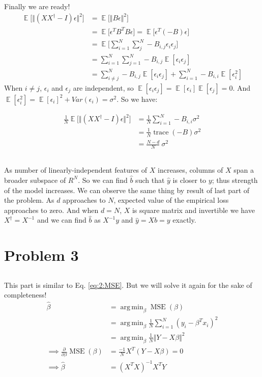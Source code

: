 \documentclass[]{article}
\numberwithin{equation}{section}
\DeclareMathOperator*{\trace}{trace}
\newcommand{\norm}[2][]{\Vert #2\Vert_{#1}}
\newcommand{\transpose}{^T}
\DeclareMathOperator{\EX}{\mathbb{E}}%
\DeclareMathOperator*{\argmin}{arg\,min}
\DeclareMathOperator*{\MSE}{MSE}
\begin{document}
Finally we are ready!
\begin{align}
\EX\biggl[\norm{(XX^{\dagger} -I)\epsilon}^2\biggr] &= \EX\biggl[\norm{B\epsilon}^2\biggr]\\
 &= \EX\biggl[\epsilon\transpose B\transpose B \epsilon \biggr] = \EX\biggl[\epsilon\transpose (-B) \epsilon \biggr]\\
& = \EX\biggl[\sum_{i=1}^{N}\sum_{j}^{N} -B_{i,j} \epsilon_i \epsilon_j\biggr]\\
& = \sum_{i=1}^{N}\sum_{j=1}^{N} -B_{i,j} \EX[ \epsilon_i \epsilon_j] \\
& = \sum_{i\neq j}^{N} -B_{i,j} \EX[ \epsilon_i \epsilon_j] + \sum_{i=1}^{N} -B_{i,i} \EX[ \epsilon_i^2]
\end{align}
When \(i \neq j\), \(\epsilon_i\) and \(\epsilon_j\) are independent, so \(\EX[ \epsilon_i \epsilon_j]=\EX[ \epsilon_i]\EX[\epsilon_j] = 0\). And \(\EX[\epsilon_i^2] = \EX[\epsilon_i]^2 + Var(\epsilon_i) = \sigma^2\). So we have:

\begin{align}
    \frac{1}{N} \EX\biggl[\norm{(XX^{\dagger} -I)\epsilon}^2\biggr] &=\frac{1}{N} \sum_{i=1}^{N} -B_{i,i} \sigma^2 \\
    &= \frac{1}{N}\trace(-B) \sigma^2 \\
    &= \frac{N-d}{N}\ \sigma^2
\end{align}

\subsection{}
As number of linearly-independent features of \(X\) increases, columns of \(X\) span a broader subspace of \(R^N\).
So we can find \(\hat{b}\) such that \(\hat{y}\) is closer to \(y\); thus strength of the model increases.
We can observe the same thing by result of last part of the problem. As \(d\) approaches to \(N\), expected value of the empirical loss approaches to zero.
And when \(d=N\), \(X\) is square matrix and invertible we have \(X^{\dagger} = X^{-1}\) and we can find \(\hat{b}\) as \(X^{-1}y\) and \(\hat{y}=Xb=y\) exactly.

\section{Problem 3}
\subsection{}
This part is similar to Eq. \ref{eq:2:MSE}. But we will solve it again for the sake of completeness!
\begin{align}
\hat{\beta} &= \argmin_\beta \MSE(\beta)\\
&= \argmin_\beta \frac{1}{N} \sum_{i=1}^{N} (y_i - \beta\transpose x_i)^2 \\
&= \argmin_\beta \frac{1}{N} \norm{Y - X\beta}^2 \\
\implies \frac{\partial}{\partial \beta} \MSE(\beta) &= \frac{-1}{N} X\transpose (Y - X\beta) = 0 \\
\implies \hat{\beta} &= (X\transpose X)^{-1} X\transpose Y\\
\end{align}
\end{document}
